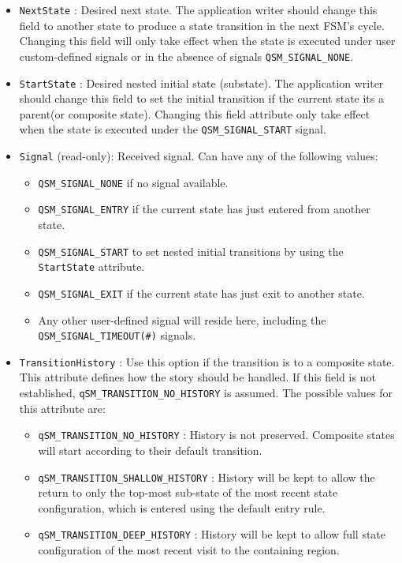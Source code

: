 \begin{itemize}
    \item \lstinline{NextState} : Desired next state. The application writer should change this field to another state to produce a state transition in the next FSM's cycle. Changing this field will only take effect when the state is executed under user custom-defined signals or in the absence of signals \lstinline{QSM_SIGNAL_NONE}.
    \item \lstinline{StartState} :  Desired nested initial state (substate). The application writer should change this field to set the initial transition if the current state its a parent(or composite state). Changing this field attribute only take effect when the state is executed under the \lstinline{QSM_SIGNAL_START} signal.
    \item \lstinline{Signal} (read-only): Received signal. Can have any of the following values: 
    \begin{itemize}
        \item \lstinline{QSM_SIGNAL_NONE} if no signal available.
        \item \lstinline{QSM_SIGNAL_ENTRY} if the current state has just entered from another state.
        \item \lstinline{QSM_SIGNAL_START} to set nested initial transitions by using the \lstinline{StartState} attribute.
        \item \lstinline{QSM_SIGNAL_EXIT} if the current state has just exit to another state.
        \item Any other user-defined signal will reside here, including the \lstinline{QSM_SIGNAL_TIMEOUT(#)} signals.
    \end{itemize}    
    \item \lstinline{TransitionHistory} : Use this option if the transition is to a composite state. This attribute defines how the story should be handled. If this field is not established, \lstinline{qSM_TRANSITION_NO_HISTORY} is assumed. The possible values for this attribute are:
    \begin{itemize}
        \item \lstinline{qSM_TRANSITION_NO_HISTORY} : History is not preserved. Composite states will start according to their default transition.
        \item \lstinline{qSM_TRANSITION_SHALLOW_HISTORY} : History will be kept to allow the return to only the top-most sub-state of the most recent state configuration, which is entered using the default entry rule.
        \item \lstinline{qSM_TRANSITION_DEEP_HISTORY} : History will be kept to allow full state configuration of the most recent visit to the containing region.

\end{itemize}
\end{itemize}
